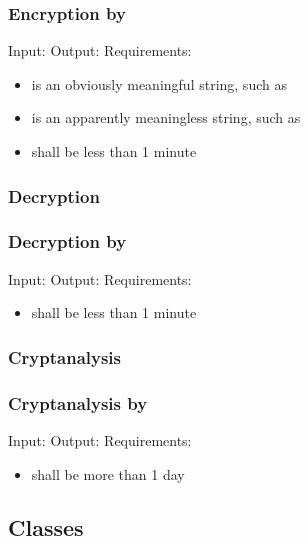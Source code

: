 \begin{frame}
\frametitle{Encryption by \alice}
Input: \encryptin \medskip
Output: \encryptout \medskip
Requirements:
\begin{itemize}
\item \plaintextarg{} is an obviously meaningful string,
  such as \plaintextex
\item \ciphertextarg{} is an apparently meaningless string,
  such as \ciphertextex
\item \encrypttime{} shall be less than 1 minute
\end{itemize}
\end{frame}

\subsubsection{Decryption}
\begin{frame}
\frametitle{Decryption by \bob}
Input: \decryptin \medskip
Output: \decryptout \medskip
Requirements:
\begin{itemize}
\item \decrypttime{} shall be less than 1 minute
\end{itemize}
\end{frame}

\subsubsection{Cryptanalysis}
\begin{frame}
\frametitle{Cryptanalysis by \eve}
Input: \cryptanalyzein \medskip
Output: \cryptanalyzeout \medskip
Requirements:
\begin{itemize}
\item \cryptanalyzetime{} shall be more than 1 day
\end{itemize}
\end{frame}


\subsection{Classes}
\lstset{language=C++} %
\newcommand{\csh}{../../src/\cs/\cs.h}

\begin{frame}
\frametitle{}
\codes{}
\end{frame}

\begin{frame}
\codes{}
\end{frame}

